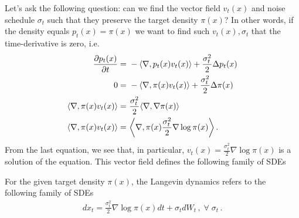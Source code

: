 Let's ask the following question: can we find the vector field $v_t(x)$ and noise schedule $\sigma_t$ such that they preserve the target density $\pi(x)$? In other words, if the density equals $p_t(x)=\pi(x)$ we want to find such $v_t(x),\sigma_t$ that the time-derivative is zero, i.e.
\begin{align}
    \deriv{p_t(x)}{t} =~& -\inner{\nabla}{p_t(x)v_t(x)} + \frac{\sigma_t^2}{2}\Delta p_t(x)\\
    0 =~& -\inner{\nabla}{\pi(x)v_t(x)} + \frac{\sigma_t^2}{2}\Delta \pi(x)\\
    \inner{\nabla}{\pi(x)v_t(x)} =~& \frac{\sigma_t^2}{2}\inner{\nabla}{\nabla \pi(x)} \\
    \inner{\nabla}{\pi(x)v_t(x)} =~& \inner{\nabla}{\pi(x)\frac{\sigma_t^2}{2}\nabla \log \pi(x)}\,.
\end{align}
From the last equation, we see that, in particular, $v_t(x) = \frac{\sigma_t^2}{2}\nabla \log \pi(x)$ is a solution of the equation.  This vector field defines the following family of SDEs
\begin{mybox}
\begin{definition}
    For the given target density $\pi(x)$, the Langevin dynamics refers to the following family of SDEs
    \begin{align}
        dx_t = \frac{\sigma_t^2}{2}\nabla\log \pi(x)dt + \sigma_t dW_t\,, \;\forall\;\sigma_t\,.
    \end{align}
\end{definition}
\end{mybox}

